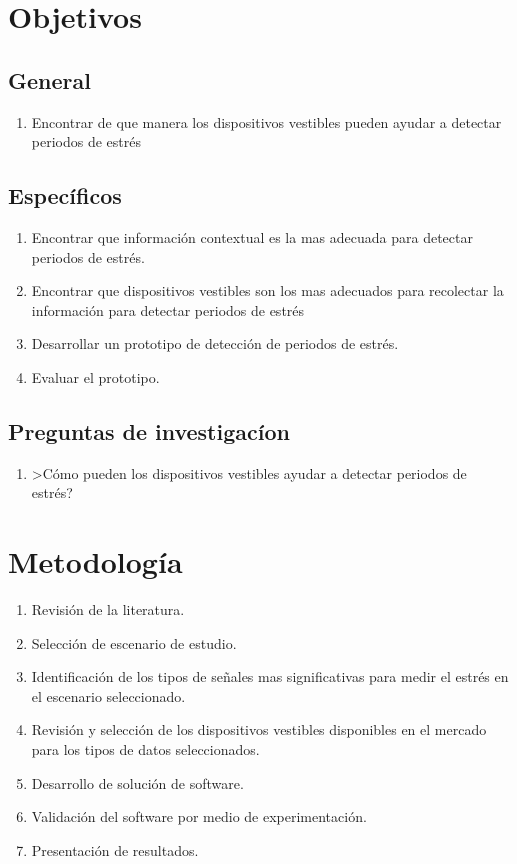 \documentclass[letterpaper,12pt]{cicese}
\begin{document}
		\chapter{Objetivos}
			\section{General}
				\begin{enumerate}
					\item Encontrar de que manera los dispositivos vestibles pueden ayudar a detectar periodos de estr\'es
				\end{enumerate}
			\section{Espec\'ificos}
				\begin{enumerate}
					\item Encontrar que informaci\'on contextual es la mas adecuada para detectar periodos de estr\'es.
					\item Encontrar que dispositivos vestibles son los mas adecuados para recolectar la informaci\'on para detectar periodos de estr\'es
					\item Desarrollar un prototipo de detecci\'on de periodos de estr\'es.
					\item Evaluar el prototipo.
				\end{enumerate}
			\section{Preguntas de investigac\'ion}
				\begin{enumerate}
					\item >C\'omo pueden los dispositivos vestibles ayudar a detectar periodos de estr\'es?
				\end{enumerate}
		\chapter{Metodolog\'ia}
				\begin{enumerate}
					\item Revisi\'on de la literatura.
					\item Selecci\'on de escenario de estudio.
					\item Identificaci\'on de los tipos de se\~nales mas significativas para medir el estr\'es en el escenario seleccionado.
					\item Revisi\'on y selecci\'on de los dispositivos vestibles disponibles en el mercado para los tipos de datos seleccionados.
					\item Desarrollo de soluci\'on de software.
					\item Validaci\'on del software por medio de experimentaci\'on.
					\item Presentaci\'on de resultados.
				\end{enumerate}
\end{document}
